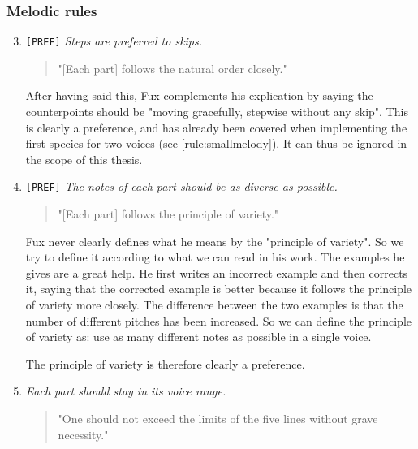 \subsubsection{Melodic rules}
\begin{enumerate}[wide, label=\bfseries 1.M\arabic*]
\setcounter{enumi}{2} %
    \item\label{rule:steps-prefered} \texttt{[PREF]} \textit{Steps are preferred to skips.}

    \begin{quotation}
    "[Each part] follows the natural order closely."
    \textcite[p.73]{GaPEng}
    \end{quotation}

    After having said this, Fux complements his explication by saying the counterpoints should be "moving gracefully, stepwise without any skip". This is clearly a preference, and has already been covered when implementing the first species for two voices (see \ref{rule:smallmelody}). It can thus be ignored in the scope of this thesis.

    \item\label{rule:variety} \texttt{[PREF]}  \textit{The notes of each part should be as diverse as possible.}

    \begin{quotation}
    "[Each part] follows the principle of variety."
    \textcite[p.73]{GaPEng}
    \end{quotation}

    Fux never clearly defines what he means by the "principle of variety". So we try to define it according to what we can read in his work. The examples he gives are a great help. He first writes an incorrect example and then corrects it, saying that the corrected example is better because it follows the principle of variety more closely. The difference between the two examples is that the number of different pitches has been increased. So we can define the principle of variety as: use as many different notes as possible in a single voice. 

    The principle of variety is therefore clearly a preference.

    \item\label{rule:each-part-should-stay-in-its-voice-range}  \textit{Each part should stay in its voice range.}

    \begin{quotation}
    "One should not exceed the limits of the five lines without grave necessity."
    \textcite[p.79]{GaPEng}
    \end{quotation}


\end{enumerate}
